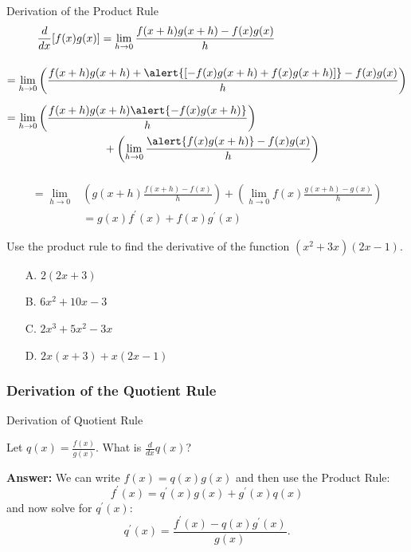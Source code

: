 \documentclass[cal1spr16Lectures.tex]{subfiles}
\begin{document}
\begin{frame}[allowframebreaks]{\small Derivation of the Product Rule}\footnotesize
\begin{align*}
&\frac{d}{dx}[f(x)g(x)] = \lim_{h \to 0} \frac{f(x+h)g(x+h)-f(x)g(x)}{h} \\[1pc]
 =\lim_{h \to 0} &\left(\frac{f(x+h)g(x+h)+\alert{[-f(x)g(x+h)+f(x)g(x+h)]}-f(x)g(x)}{h}\right) \\[0.5pc] 
 =\lim_{h \to 0} &\left(\frac{f(x+h)g(x+h)\alert{-f(x)g(x+h)}}{h}\right) \\
&\hspace{5pc} + \left(\lim_{h \to 0}\frac{\alert{f(x)g(x+h)}-f(x)g(x)}{h}\right) \\[0.5pc]
\end{align*} 

\framebreak
\begin{align*} 
 =\lim_{h \to 0} &\left(g(x+h) \frac{f(x+h)-f(x)}{h}\right) + \left(\lim_{h \to 0} f(x) \frac{g(x+h)-g(x)}{h}\right) \\[0.5pc]
 &=g(x)f^{\prime}(x)+f(x)g^{\prime}(x)
\end{align*}
\end{frame}

\begin{frame}
\begin{exe} 
Use the product rule to find the derivative of the function $(x^2+3x)(2x-1)$.
\begin{itemize}
\item[A. ] $2(2x+3)$
\item[B. ] $6x^2+10x-3$
\item[C. ] $2x^3+5x^2-3x$
\item[D. ] $2x(x+3)+x(2x-1)$
\end{itemize}
\end{exe}
\end{frame}

\subsubsection{Derivation of the Quotient Rule}

\begin{frame}{\small Derivation of Quotient Rule}\footnotesize
\begin{que} Let $q(x)=\frac{f(x)}{g(x)}$.  What is $\frac{d}{dx}q(x)$? \end{que}
{\bf Answer:} We can write $f(x)=q(x) g(x)$ and then use the Product Rule:
\[f^{\prime}(x) = q^{\prime}(x) g(x) + g^{\prime}(x) q(x)\] 
and now solve for $q^{\prime}(x)$: 
\[q^{\prime}(x)=\frac{f^{\prime}(x)-q(x)g^{\prime}(x)}{g(x)}.\]
\end{frame} 
\end{document}
